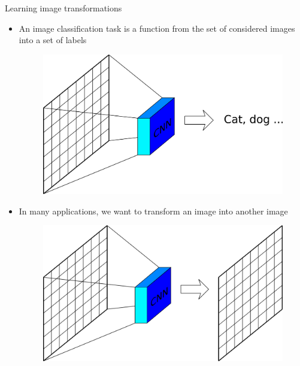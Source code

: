 \documentclass[xcolor=pdftex,dvipsnames,table,mathserif]{beamer}
\begin{document}
\begin{frame}{Learning image transformations}

  \begin{itemize}
  \item An image classification task is a function from the set of considered images into a set of labels
      \begin{figure}
      \includegraphics[width=0.40\textheight]{image_classif.png}
      \end{figure}
  \item In many applications, we want to transform an image into another image
      \begin{figure}
      \includegraphics[width=0.40\textheight]{image_transf0.png}
      \end{figure}
  \end{itemize}

\end{frame}
\end{document}
